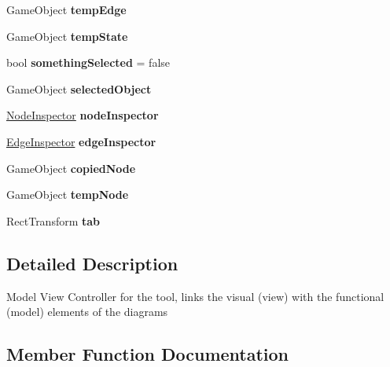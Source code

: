 \begin{DoxyCompactItemize}
Game\+Object {\bfseries temp\+Edge}
\item 
\mbox{\label{class_model_view_controller_a1286a134fbcb061f3f6c0cacef0d932b}} 
Game\+Object {\bfseries temp\+State}
\item 
\mbox{\label{class_model_view_controller_adc66a5588a24798d9f841b692ea9535a}} 
bool {\bfseries something\+Selected} = false
\item 
\mbox{\label{class_model_view_controller_a69ab61b3629af37235c4176dc4983259}} 
Game\+Object {\bfseries selected\+Object}
\item 
\mbox{\label{class_model_view_controller_a01ebde35333857fff2556d966be1e71a}} 
\hyperlink{class_node_inspector}{Node\+Inspector} {\bfseries node\+Inspector}
\item 
\mbox{\label{class_model_view_controller_a4f1f19194987a457784f16c46f5ca554}} 
\hyperlink{class_edge_inspector}{Edge\+Inspector} {\bfseries edge\+Inspector}
\item 
\mbox{\label{class_model_view_controller_a2570ca12086280f2e0880fe9ecfdf69d}} 
Game\+Object {\bfseries copied\+Node}
\item 
\mbox{\label{class_model_view_controller_ac854a59175e809681769268b0efc9832}} 
Game\+Object {\bfseries temp\+Node}
\item 
\mbox{\label{class_model_view_controller_adebc28b6cf6acb553f09d9c8238a6520}} 
Rect\+Transform {\bfseries tab}
\end{DoxyCompactItemize}


\subsection{Detailed Description}
Model View Controller for the tool, links the visual (view) with the functional (model) elements of the diagrams 



\subsection{Member Function Documentation}
\mbox{\label{class_model_view_controller_a1a31ef775ee8e6090e99e0e09dff4eab}} 
